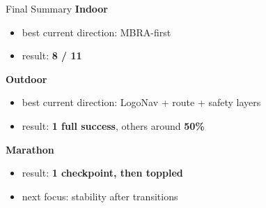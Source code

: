 \documentclass[aspectratio=169]{beamer}
\begin{document}
\begin{frame}{Final Summary}
\textbf{Indoor}
\begin{itemize}
  \item best current direction: MBRA-first
  \item result: \textbf{8 / 11}
\end{itemize}

\textbf{Outdoor}
\begin{itemize}
  \item best current direction: LogoNav + route + safety layers
  \item result: \textbf{1 full success}, others around \textbf{50\%}
\end{itemize}

\textbf{Marathon}
\begin{itemize}
  \item result: \textbf{1 checkpoint, then toppled}
  \item next focus: stability after transitions
\end{itemize}
\end{frame}
\end{document}
